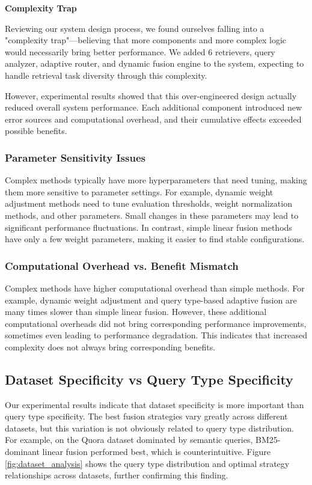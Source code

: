 \documentclass[letterpaper]{article} %
\begin{document}
\textbf{Complexity Trap}

Reviewing our system design process, we found ourselves falling into a "complexity trap"—believing that more components and more complex logic would necessarily bring better performance. We added 6 retrievers, query analyzer, adaptive router, and dynamic fusion engine to the system, expecting to handle retrieval task diversity through this complexity.

However, experimental results showed that this over-engineered design actually reduced overall system performance. Each additional component introduced new error sources and computational overhead, and their cumulative effects exceeded possible benefits.

\subsubsection{Parameter Sensitivity Issues}

Complex methods typically have more hyperparameters that need tuning, making them more sensitive to parameter settings. For example, dynamic weight adjustment methods need to tune evaluation thresholds, weight normalization methods, and other parameters. Small changes in these parameters may lead to significant performance fluctuations. In contrast, simple linear fusion methods have only a few weight parameters, making it easier to find stable configurations.

\subsubsection{Computational Overhead vs. Benefit Mismatch}

Complex methods have higher computational overhead than simple methods. For example, dynamic weight adjustment and query type-based adaptive fusion are many times slower than simple linear fusion. However, these additional computational overheads did not bring corresponding performance improvements, sometimes even leading to performance degradation. This indicates that increased complexity does not always bring corresponding benefits.

\subsection{Dataset Specificity vs Query Type Specificity}

Our experimental results indicate that dataset specificity is more important than query type specificity. The best fusion strategies vary greatly across different datasets, but this variation is not obviously related to query type distribution. For example, on the Quora dataset dominated by semantic queries, BM25-dominant linear fusion performed best, which is counterintuitive. Figure \ref{fig:dataset_analysis} shows the query type distribution and optimal strategy relationships across datasets, further confirming this finding.
\end{document}
